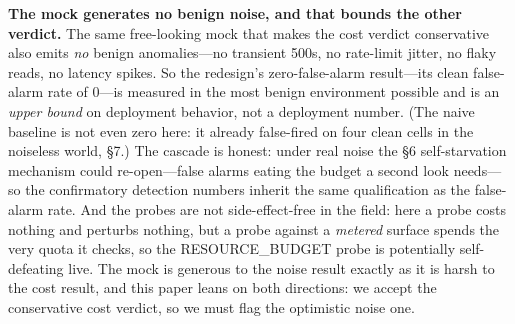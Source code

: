 \documentclass[acmsmall,screen]{acmart}
\begin{document}
\textbf{The mock generates no benign noise, and that bounds the other verdict.}
The same free-looking mock that makes the cost verdict conservative also emits
\emph{no} benign anomalies---no transient 500s, no rate-limit jitter, no flaky
reads, no latency spikes. So the redesign's zero-false-alarm result---its clean
false-alarm rate of 0---is measured in the most benign environment possible and is
an \emph{upper bound} on deployment behavior, not a deployment number. (The naive
baseline is not even zero here: it already false-fired on four clean cells in the
noiseless world, \S7.) The cascade is honest: under real noise the \S6
self-starvation mechanism could re-open---false alarms eating the budget a second
look needs---so the confirmatory detection numbers inherit the same qualification
as the false-alarm rate. And the probes are not side-effect-free in the field:
here a probe costs nothing and perturbs nothing, but a probe against a
\emph{metered} surface spends the very quota it checks, so the RESOURCE\_BUDGET
probe is potentially self-defeating live. The mock is generous to the noise
result exactly as it is harsh to the cost result, and this paper leans on both
directions: we accept the conservative cost verdict, so we must flag the
optimistic noise one.
\end{document}
